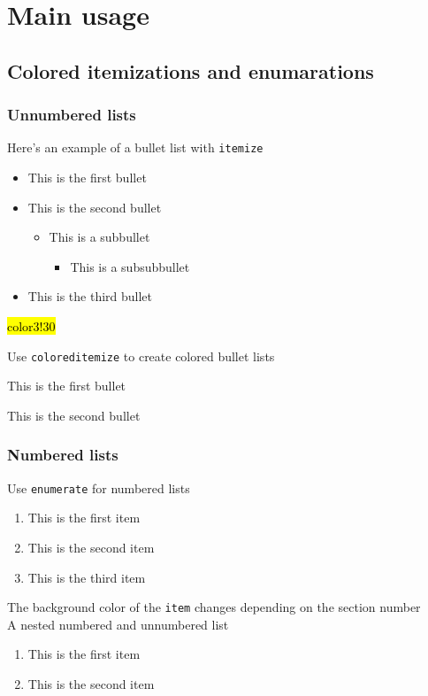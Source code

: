 \documentclass[aspectratio=169, 12pt, t]{beamer}
\begin{document}
\section{Main usage}


\subsection{Colored itemizations and enumarations}

\begin{frame}
    \frametitle{Unnumbered lists}
    Here's an example of a bullet list with \texttt{itemize}
    \begin{itemize}
        \item This is the first bullet
        \item This is the second bullet
        \begin{itemize}
            \item This is a subbullet
            \begin{itemize}
                \item This is a subsubbullet
            \end{itemize}
        \end{itemize}
        \item This is the third bullet
    \end{itemize}
    \hl{color3!30}{%
        Use \texttt{coloreditemize} to create colored bullet lists
        \begin{coloreditemize}
            \item This is the first bullet
            \item This is the second bullet
        \end{coloreditemize}
    }
\end{frame}

\begin{frame}[t]
    \frametitle{Numbered lists}
    Use \texttt{enumerate} for numbered lists
    \begin{enumerate}
        \item This is the first item
        \item This is the second item
        \item This is the third item
    \end{enumerate}
    The background color of the \texttt{item} changes depending on the section number\\[\baselineskip]
    A nested numbered and unnumbered list
    \begin{enumerate}
        \item This is the first item
        \item This is the second item
    \end{enumerate}
\end{frame}
\end{document}
